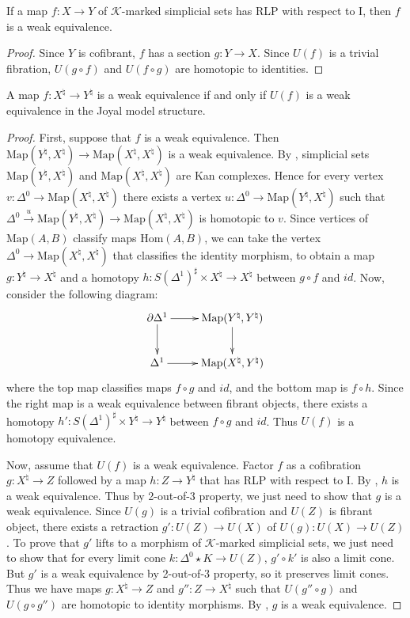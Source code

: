 \documentclass[reqno]{amsart}
\theoremstyle{definition}
\theoremstyle{remark}
\newcommand{\K}{$\mathcal{K}$}
\newcommand{\join}{\star}
\newcommand{\Hom}{\mathrm{Hom}}
\newcommand{\Map}{\mathrm{Map}}
\newcommand{\I}{\mathrm{I}}
\numberwithin{figure}{section}
\begin{document}
\begin{cor}[iinj]
If a map $f : X \to Y$ of \K-marked simplicial sets has RLP with respect to $\I$, then $f$ is a weak equivalence.
\end{cor}
\begin{proof}
Since $Y$ is cofibrant, $f$ has a section $g : Y \to X$.
Since $U(f)$ is a trivial fibration, $U(g \circ f)$ and $U(f \circ g)$ are homotopic to identities.
\end{proof}

\begin{prop}
A map $f : X^\natural \to Y^\natural$ is a weak equivalence if and only if $U(f)$ is a weak equivalence in the Joyal model structure.
\end{prop}
\begin{proof}
First, suppose that $f$ is a weak equivalence.
Then $\Map(Y^\natural,X^\natural) \to \Map(X^\natural,X^\natural)$ is a weak equivalence.
By , simplicial sets $\Map(Y^\natural,X^\natural)$ and $\Map(X^\natural,X^\natural)$ are Kan complexes.
Hence for every vertex $v : \Delta^0 \to \Map(X^\natural,X^\natural)$ there exists a vertex $u : \Delta^0 \to \Map(Y^\natural,X^\natural)$
such that $\Delta^0 \xrightarrow{u} \Map(Y^\natural,X^\natural) \to \Map(X^\natural,X^\natural)$ is homotopic to $v$.
Since vertices of $\Map(A,B)$ classify maps $\Hom(A,B)$, we can take the vertex $\Delta^0 \to \Map(X^\natural,X^\natural)$ that classifies the identity morphism,
to obtain a map $g : Y^\natural \to X^\natural$ and a homotopy $h : S(\Delta^1)^\sharp \times X^\natural \to X^\natural$ between $g \circ f$ and $id$.
Now, consider the following diagram:
\[ \xymatrix{ \partial \Delta^1 \ar[d] \ar[r] & \Map(Y^\natural,Y^\natural) \ar[d] \\
              \Delta^1 \ar[r] & \Map(X^\natural,Y^\natural)
            } \]
where the top map classifies maps $f \circ g$ and $id$, and the bottom map is $f \circ h$.
Since the right map is a weak equivalence between fibrant objects, there exists a homotopy $h' : S(\Delta^1)^\sharp \times Y^\natural \to Y^\natural$ between $f \circ g$ and $id$.
Thus $U(f)$ is a homotopy equivalence.

Now, assume that $U(f)$ is a weak equivalence.
Factor $f$ as a cofibration $g : X^\natural \to Z$ followed by a map $h : Z \to Y^\natural$ that has RLP with respect to $\I$.
By , $h$ is a weak equivalence.
Thus by 2-out-of-3 property, we just need to show that $g$ is a weak equivalence.
Since $U(g)$ is a trivial cofibration and $U(Z)$ is fibrant object, there exists a retraction $g' : U(Z) \to U(X)$ of $U(g) : U(X) \to U(Z)$.
To prove that $g'$ lifts to a morphism of \K-marked simplicial sets, we just need to show that for every limit cone $k : \Delta^0 \join K \to U(Z)$, $g' \circ k'$ is also a limit cone.
But $g'$ is a weak equivalence by 2-out-of-3 property, so it preserves limit cones.
Thus we have maps $g : X^\natural \to Z$ and $g'' : Z \to X^\natural$ such that $U(g'' \circ g)$ and $U(g \circ g'')$ are homotopic to identity morphisms.
By , $g$ is a weak equivalence.
\end{proof}
\end{document}
